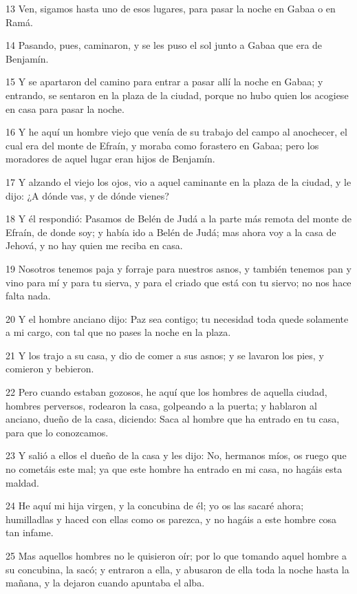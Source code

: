 \par 13 Ven, sigamos hasta uno de esos lugares, para pasar la noche en Gabaa o en Ramá.
\par 14 Pasando, pues, caminaron, y se les puso el sol junto a Gabaa que era de Benjamín.
\par 15 Y se apartaron del camino para entrar a pasar allí la noche en Gabaa; y entrando, se sentaron en la plaza de la ciudad, porque no hubo quien los acogiese en casa para pasar la noche.
\par 16 Y he aquí un hombre viejo que venía de su trabajo del campo al anochecer, el cual era del monte de Efraín, y moraba como forastero en Gabaa; pero los moradores de aquel lugar eran hijos de Benjamín.
\par 17 Y alzando el viejo los ojos, vio a aquel caminante en la plaza de la ciudad, y le dijo: ¿A dónde vas, y de dónde vienes?
\par 18 Y él respondió: Pasamos de Belén de Judá a la parte más remota del monte de Efraín, de donde soy; y había ido a Belén de Judá; mas ahora voy a la casa de Jehová, y no hay quien me reciba en casa.
\par 19 Nosotros tenemos paja y forraje para nuestros asnos, y también tenemos pan y vino para mí y para tu sierva, y para el criado que está con tu siervo; no nos hace falta nada.
\par 20 Y el hombre anciano dijo: Paz sea contigo; tu necesidad toda quede solamente a mi cargo, con tal que no pases la noche en la plaza.
\par 21 Y los trajo a su casa, y dio de comer a sus asnos; y se lavaron los pies, y comieron y bebieron.
\par 22 Pero cuando estaban gozosos, he aquí que los hombres de aquella ciudad, hombres perversos, rodearon la casa, golpeando a la puerta; y hablaron al anciano, dueño de la casa, diciendo: Saca al hombre que ha entrado en tu casa, para que lo conozcamos.
\par 23 Y salió a ellos el dueño de la casa y les dijo: No, hermanos míos, os ruego que no cometáis este mal; ya que este hombre ha entrado en mi casa, no hagáis esta maldad.
\par 24 He aquí mi hija virgen, y la concubina de él; yo os las sacaré ahora; humilladlas y haced con ellas como os parezca, y no hagáis a este hombre cosa tan infame.
\par 25 Mas aquellos hombres no le quisieron oír; por lo que tomando aquel hombre a su concubina, la sacó; y entraron a ella, y abusaron de ella toda la noche hasta la mañana, y la dejaron cuando apuntaba el alba.
